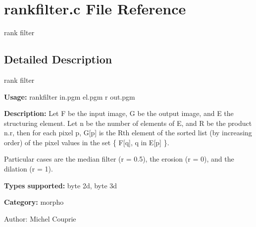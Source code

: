 \section{rankfilter.c File Reference}
\label{rankfilter_8c}
rank filter  




\label{_details}
\subsection{Detailed Description}
rank filter 

{\bf Usage:} rankfilter in.pgm el.pgm r out.pgm

{\bf Description:} Let F be the input image, G be the output image, and E the structuring element. Let n be the number of elements of E, and R be the product n.r, then for each pixel p, G[p] is the Rth element of the sorted list (by increasing order) of the pixel values in the set \{ F[q], q in E[p] \}.

Particular cases are the median filter (r = 0.5), the erosion (r = 0), and the dilation (r = 1).

{\bf Types supported:} byte 2d, byte 3d

{\bf Category:} morpho

\begin{Desc}
\item[Author:]Michel Couprie \end{Desc}

